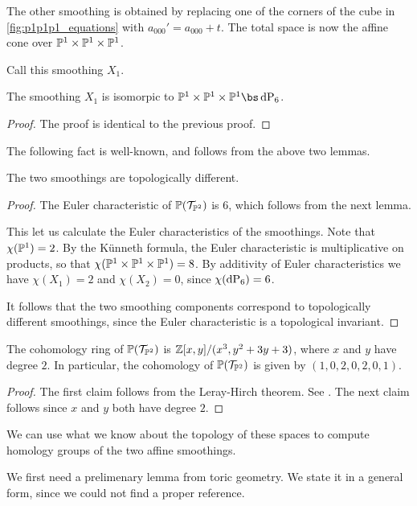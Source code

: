 The other smoothing is obtained by replacing one of the corners of the cube in \cref{fig:p1p1p1_equations} with $a_{000}'=a_{000}+t$. The total space is now the affine cone over $\P^1 \times \P^1 \times \P^1$. 

Call this smoothing $X_1.$

\begin{lemma}
The smoothing $X_1$ is isomorpic to $\P^1 \times \P^1 \times \P^1 \bs \dP6$.
\end{lemma}
\begin{proof}
The proof is identical to the previous proof.
\end{proof}

The following fact is well-known, and follows from the above two lemmas.

\begin{proposition}
The two smoothings are topologically different.
\end{proposition}
\begin{proof}
The Euler characteristic of $\P(\mathcal T_{\P^2})$ is $6$, which follows from the next lemma.

This let us calculate the Euler characteristics of the smoothings. Note that $\chi(\P^1)=2$. By the Künneth formula, the Euler characteristic is multiplicative on products, so that $\chi(\P^1 \times \P^1 \times \P^1)=8$. By additivity of Euler characteristics we have $\chi(X_1)=2$ and $\chi(X_2)=0$, since $\chi(\dP6)=6$.

It follows that the two smoothing components correspond to topologically different smoothings, since the Euler characteristic is a topological invariant.
\end{proof}

\begin{lemma}
The cohomology ring of $\P(\mathcal T_{\P^2})$ is $\Z[x,y]/(x^3,y^2+3y+3)$, where $x$ and $y$ have degree $2$. In particular, the cohomology of $\P(\mathcal T_{\P^2})$ is given by $(1,0,2,0,2,0,1)$.
\end{lemma}
\begin{proof}
The first claim follows from the Leray-Hirch theorem. See \cite[page 270]{bott_tu}. The next claim follows since $x$ and $y$ both have degree $2$.
\end{proof}

We can use what we know about the topology of these spaces to compute homology groups of the two affine smoothings.

We first need a prelimenary lemma from toric geometry. We state it in a general form, since we could not find a proper reference.

